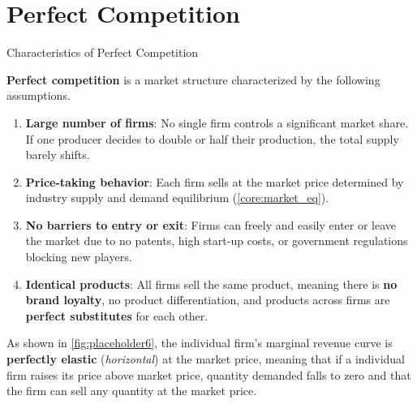 \documentclass[10pt]{article}
\begin{document}
\section{Perfect Competition}
    
  \begin{core}[label=core:perf_comp]{Characteristics of Perfect Competition}

    \textbf{Perfect competition} is a market structure characterized by the following assumptions.

    \begin{enumerate}

      \item \textbf{Large number of firms}: No single firm controls a significant market share. If one producer decides to double or half their production, the total supply barely shifts. 

      \item \textbf{Price-taking behavior}: Each firm sells at the market price determined by industry supply and demand equilibrium (\autoref{core:market_eq}).

      \item \textbf{No barriers to entry or exit}: Firms can freely and easily enter or leave the market due to no patents, high start-up costs, or government regulations blocking new players. 

      \item \textbf{Identical products}: All firms sell the same product, meaning there is \textbf{no brand loyalty}, no product differentiation, and products across firms are \textbf{perfect substitutes} for each other.

    \end{enumerate}


    As shown in \autoref{fig:placeholder6}, the individual firm's marginal revenue curve is \textbf{perfectly elastic} (\textit{horizontal}) at the market price, meaning that if a individual firm raises its price above market price, quantity demanded falls to zero and that the firm can sell any quantity at the market price.

  \end{core}
\end{document}
